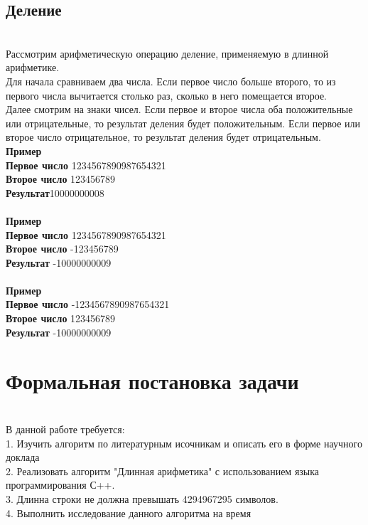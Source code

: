 \documentclass[a4paper]{article}
\begin{document}
\subsection{Деление}
\\Рассмотрим арифметическую операцию деление, применяемую в длинной арифметике.
\\Для начала сравниваем два числа. Если первое число больше второго, то из первого числа вычитается столько раз, сколько в него помещается второе.
\\Далее смотрим на знаки чисел. Если первое и второе числа оба положительные или отрицательные, то результат деления будет положительным. Если первое или второе число отрицательное, то результат деления будет отрицательным.
\\ \textbf{Пример}
\\ \textbf{Первое число} 1234567890987654321
\\ \textbf{Второе число} 123456789
\\ \textbf{Результат}10000000008
\\
\\ \textbf{Пример}
\\ \textbf{Первое число} 1234567890987654321
\\ \textbf{Второе число} -123456789
\\ \textbf{Результат} -10000000009
\\
\\ \textbf{Пример}
\\ \textbf{Первое число} -1234567890987654321
\\ \textbf{Второе число} 123456789
\\ \textbf{Результат} -10000000009

\newpage

\section{Формальная постановка задачи}
\\В данной работе требуется:
\\1. Изучить алгоритм по литературным исочникам и описать его в форме научного доклада
\\2. Реализовать алгоритм "Длинная арифметика" с использованием языка программирования С++.
\\3. Длинна строки не должна превышать 4294967295 символов.
\\4. Выполнить исследование данного алгоритма на время
\newpage
\end{document}
